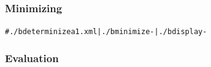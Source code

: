 \subsubsection{Minimizing}

\begin{alltt}
# ./b determinize a1.xml | ./b minimize - | ./b display -
\end{alltt}

\begin{center}
\end{center}

\subsubsection{Evaluation}

